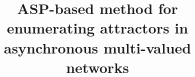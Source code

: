 \documentclass{bmcart}
\begin{document}
\begin{frontmatter}

\begin{fmbox}


\title{ASP-based method for enumerating attractors in asynchronous multi-valued networks }


\author[
   addressref={univ1},                   %
   email={emna.ben-abdallah@irccyn.ec-nantes.fr}   %
]{ }
\author[
   addressref={univ2},
   email={maxime.folschette@unice.fr}
   ]{ }
\author[
   addressref={univ1},
   email={olivier.roux@irccyn.ec-nantes.fr}
]{ }
\author[
   addressref={univ1, univ3},
   email={morgan.magnin@irccyn.ec-nantes.fr}
]{ }



\end{fmbox}
\end{frontmatter}
\end{document}
